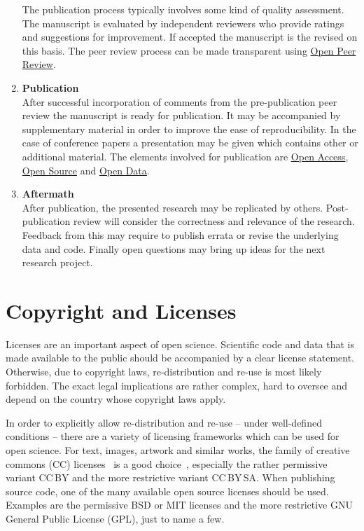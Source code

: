 \documentclass[a4paper, 10pt, twocolumn]{article}
\begin{document}
\begin{enumerate}
The publication process typically involves some kind of quality assessment. The manuscript is evaluated by
independent reviewers who provide ratings and suggestions for improvement. If accepted the manuscript is
the revised on this basis. The peer review process can be made transparent using \underline{Open Peer Review}.
%
\item \textbf{Publication}\\
After successful incorporation of comments from the pre-publication peer review the manuscript is ready for
publication. It may be accompanied by supplementary material in order to improve the ease of reproducibility. In the
case of conference papers a presentation may be given which contains other or additional material. The elements involved
for publication are \underline{Open Access}, \underline{Open Source} and \underline{Open Data}.
%
\item \textbf{Aftermath}\\
After publication, the presented research may be replicated by others. Post-publication
review will consider the correctness and relevance of the research. Feedback from this
may require to publish errata or revise the underlying data and code. Finally open 
questions may bring up ideas for the next research project.
\end{enumerate}


\section*{Copyright and Licenses} \label{sec:copyright}

Licenses are an important aspect of open science. Scientific code and data that is made 
available to the public should be accompanied by a clear license statement. Otherwise,
due to copyright laws, re-distribution and re-use is most likely forbidden.
The exact legal implications are
rather complex, hard to oversee and depend on the country whose copyright laws apply.

In order to explicitly allow re-distribution and re-use -- under well-defined conditions -- there are
a variety of licensing frameworks which can be used for open science.
For text, images, artwork and similar works, the family of 
creative commons (CC) licenses~\cite{CC} is a good choice~\cite{Kreuzer14:Book},
especially the rather permissive variant CC\,BY and the more restrictive variant CC\,BY\,SA.
When publishing source code, one of the many available open source licenses should be used.
Examples are the permissive BSD or MIT licenses and the more restrictive
GNU General Public License (GPL), just to name a few.
\end{document}

